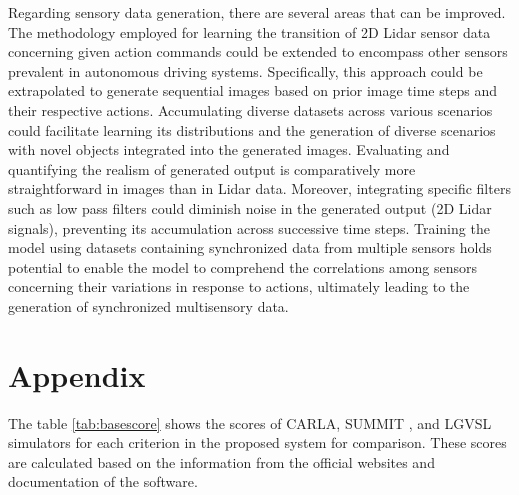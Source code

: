 \documentclass[12pt,twoside,a4paper,parskip]{scrbook} %
\begin{document}
Regarding sensory data generation, there are several areas that can be improved. The methodology employed for learning the transition of 2D Lidar sensor data concerning given action commands could be extended to encompass other sensors prevalent in autonomous driving systems. Specifically, this approach could be extrapolated to generate sequential images based on prior image time steps and their respective actions. Accumulating diverse datasets across various scenarios could facilitate learning its distributions and the generation of diverse scenarios with novel objects integrated into the generated images. Evaluating and quantifying the realism of generated output is comparatively more straightforward in images than in Lidar data. Moreover, integrating specific filters such as low pass filters could diminish noise in the generated output (2D Lidar signals), preventing its accumulation across successive time steps. Training the model using datasets containing synchronized data from multiple sensors holds potential to enable the model to comprehend the correlations among sensors concerning their variations in response to actions, ultimately leading to the generation of synchronized multisensory data.


\backmatter

\listoffigures

\listoftables
\setcounter{chapter}{1}
\renewcommand{\thechapter}{\Alph{chapter}}
\chapter*{Appendix}\label{appendix}
The table \ref{tab:basescore} shows the scores of CARLA\cite{carla-docs}, SUMMIT \cite{summit-docs}, and LGVSL\cite{lgvsl-docs} simulators for each criterion in the proposed system for comparison. These scores are calculated based on the information from the official websites and documentation of the software.
\end{document}

